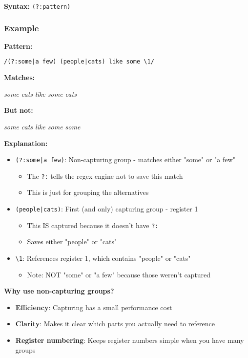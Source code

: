 \documentclass[11pt,a4paper]{article}
\theoremstyle{definition}
\theoremstyle{plain}
\theoremstyle{remark}
\begin{document}
\textbf{Syntax:} \texttt{(?:pattern)}

\subsubsection{Example}

\textbf{Pattern:}

\texttt{/(?:some|a few) (people|cats) like some \textbackslash 1/}

\textbf{Matches:}

\textit{some cats like some cats}

\textbf{But not:}

\textit{some cats like some some}

\textbf{Explanation:}
\begin{itemize}
    \item \texttt{(?:some|a few)}: Non-capturing group - matches either "some" or "a few"
    \begin{itemize}
        \item The \texttt{?:} tells the regex engine not to save this match
        \item This is just for grouping the alternatives
    \end{itemize}
    \item \texttt{(people|cats)}: First (and only) capturing group - register 1
    \begin{itemize}
        \item This IS captured because it doesn't have \texttt{?:}
        \item Saves either "people" or "cats"
    \end{itemize}
    \item \verb|\1|: References register 1, which contains "people" or "cats"
    \begin{itemize}
        \item Note: NOT "some" or "a few" because those weren't captured
    \end{itemize}
\end{itemize}

\textbf{Why use non-capturing groups?}
\begin{itemize}
    \item \textbf{Efficiency}: Capturing has a small performance cost
    \item \textbf{Clarity}: Makes it clear which parts you actually need to reference
    \item \textbf{Register numbering}: Keeps register numbers simple when you have many groups
\end{itemize}
\end{document}

